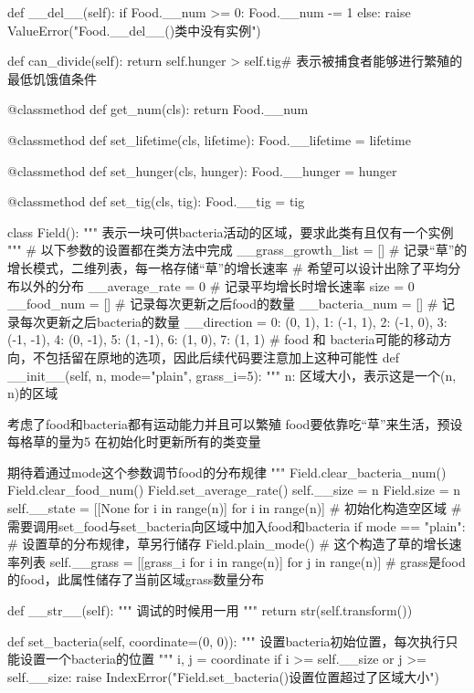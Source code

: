 \documentclass[a4paper]{ctexart}
\begin{document}
\begin{python}
		def __del__(self):
			if Food.__num >= 0:
				Food.__num -= 1
			else:
				raise ValueError("Food.__del__()类中没有实例")
	
		def can_divide(self):
			return self.hunger > self.tig# 表示被捕食者能够进行繁殖的最低饥饿值条件
	
		@classmethod
		def get_num(cls):
			return Food.__num
	
		@classmethod
		def set_lifetime(cls, lifetime):
			Food.__lifetime = lifetime
	
		@classmethod
		def set_hunger(cls, hunger):
			Food.__hunger = hunger
	
		@classmethod
		def set_tig(cls, tig):
			Food.__tig = tig

	class Field():
		"""
		表示一块可供bacteria活动的区域，要求此类有且仅有一个实例
		"""
		# 以下参数的设置都在类方法中完成
		__grass_growth_list = []  # 记录“草”的增长模式，二维列表，每一格存储“草”的增长速率
		# 希望可以设计出除了平均分布以外的分布
		__average_rate = 0  # 记录平均增长时增长速率
		size = 0
		__food_num = []  # 记录每次更新之后food的数量
		__bacteria_num = []  # 记录每次更新之后bacteria的数量
		__direction = {
			0: (0, 1),
			1: (-1, 1),
			2: (-1, 0),
			3: (-1, -1),
			4: (0, -1),
			5: (1, -1),
			6: (1, 0),
			7: (1, 1)
		}# food 和 bacteria可能的移动方向，不包括留在原地的选项，因此后续代码要注意加上这种可能性
		def __init__(self, n, mode="plain", grass_i=5):
			"""
			n: 区域大小，表示这是一个(n, n)的区域
	
			考虑了food和bacteria都有运动能力并且可以繁殖
			food要依靠吃“草”来生活，预设每格草的量为5
			在初始化时更新所有的类变量
	
			期待着通过mode这个参数调节food的分布规律
			"""
			Field.clear_bacteria_num()
			Field.clear_food_num()
			Field.set_average_rate()
			self.__size = n
			Field.size = n
			self.__state = [[None for i in range(n)] for i in range(n)]  # 初始化构造空区域
			# 需要调用set_food与set_bacteria向区域中加入food和bacteria
			if mode == "plain":
				# 设置草的分布规律，草另行储存
				Field.plain_mode()  # 这个构造了草的增长速率列表
				self.__grass = [[grass_i for i in range(n)] for j in range(n)]
				# grass是food的food，此属性储存了当前区域grass数量分布
	
		def __str__(self):
			"""
			调试的时候用一用
			"""
			return str(self.transform())
	
		def set_bacteria(self, coordinate=(0, 0)):
			"""
			设置bacteria初始位置，每次执行只能设置一个bacteria的位置
			"""
			i, j = coordinate
			if i >= self.__size or j >= self.__size:
				raise IndexError("Field.set_bacteria()设置位置超过了区域大小")
	

\end{python}
\end{document}
